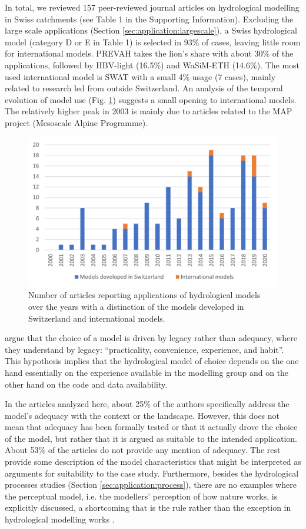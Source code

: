 \documentclass[10pt,a4paper]{article}
\begin{document}
In total, we reviewed 157 peer-reviewed journal articles on hydrological
modelling in Swiss catchments (see Table 1 in the Supporting
Information). Excluding the large scale applications (Section \ref{sec:application:largescale}), a
Swiss hydrological model (category D or E in Table 1) is selected in
93\% of cases, leaving little room for international models. PREVAH
takes the lion's share with about 30\% of the applications, followed by
HBV-light (16.5\%) and WaSiM-ETH (14.6\%). The most used international
model is SWAT with a small 4\% usage (7 cases), mainly related to
research led from outside Switzerland. An analysis of the temporal
evolution of model use (Fig. \ref{fig:bars})
suggests a small opening to international models. The relatively higher
peak in 2003 is mainly due to articles related to the MAP project
(Mesoscale Alpine Programme).

\begin{figure}[htb]
	\begin{center}
		\includegraphics[width=0.70\columnwidth]{figures/histogram}
		\caption{{{Number of articles} reporting applications of hydrological models over
				the years with a distinction of the models developed in Switzerland and
				international models.
				{\label{fig:bars}}
		}}
	\end{center}
\end{figure}

\citet{Addor_2019} argue that the choice of a model is driven by legacy
rather than adequacy, where they understand by legacy: ``practicality,
convenience, experience, and habit''. This hypothesis implies that the
hydrological model of choice depends on the one hand essentially on the
experience available in the modelling group and on the other hand on
the code and data availability. 

In the articles analyzed here, about 25\% of the authors specifically
address the model's adequacy with the context or the landscape. However,
this does not mean that adequacy has been formally tested or that it
actually drove the choice of the model, but rather that it is argued as
suitable to the intended application. About 53\% of the articles do not
provide any mention of adequacy. The rest provide some description of
the model characteristics that might be interpreted as arguments for
suitability to the case study. Furthermore, besides the hydrological
processes studies (Section \ref{sec:application:process}), there are no examples where the
perceptual model, i.e. the modellers' perception of how nature works, is
explicitly discussed, a shortcoming that is the rule rather than the
exception in hydrological modelling works \citep{beven2021}.
\end{document}
